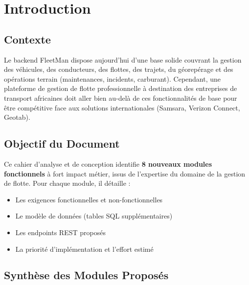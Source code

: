\documentclass[12pt,a4paper]{report}
\begin{document}
\chapter*{Introduction}
\thispagestyle{fancy}

\section*{Contexte}

Le backend FleetMan dispose aujourd'hui d'une base solide couvrant la gestion des véhicules, des conducteurs, des flottes, des trajets, du géorepérage et des opérations terrain (maintenances, incidents, carburant). Cependant, une plateforme de gestion de flotte professionnelle à destination des entreprises de transport africaines doit aller bien au-delà de ces fonctionnalités de base pour être compétitive face aux solutions internationales (Samsara, Verizon Connect, Geotab).

\section*{Objectif du Document}

Ce cahier d'analyse et de conception identifie \textbf{8 nouveaux modules fonctionnels} à fort impact métier, issus de l'expertise du domaine de la gestion de flotte. Pour chaque module, il détaille :
\begin{itemize}[leftmargin=2cm]
  \item Les exigences fonctionnelles et non-fonctionnelles
  \item Le modèle de données (tables SQL supplémentaires)
  \item Les endpoints REST proposés
  \item La priorité d'implémentation et l'effort estimé
\end{itemize}

\section*{Synthèse des Modules Proposés}
\end{document}
